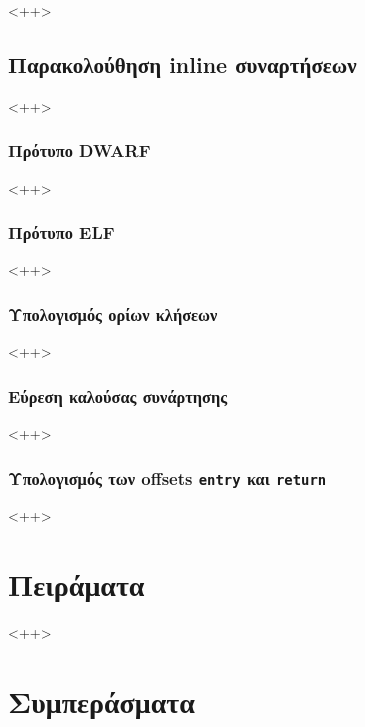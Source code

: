 \documentclass[12pt]{article}
\begin{document}
<++>

\subsection{Παρακολούθηση inline συναρτήσεων}


<++>

\subsubsection{Πρότυπο DWARF}


<++>

\subsubsection{Πρότυπο ELF}


<++>

\subsubsection{Υπολογισμός ορίων κλήσεων}

<++>

\subsubsection{Εύρεση καλούσας συνάρτησης}

<++>

\subsubsection{Υπολογισμός των offsets \lstinline{entry} και \lstinline{return}}

<++>

\section{Πειράματα}


<++>

\section{Συμπεράσματα}
\end{document}

